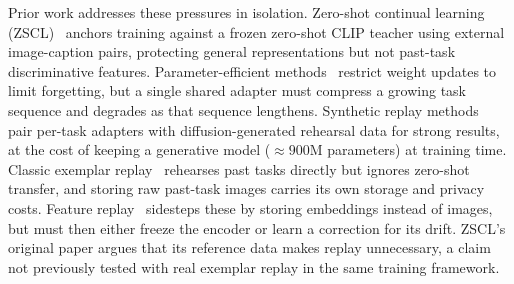 Prior work addresses these pressures in isolation. Zero-shot continual learning (ZSCL)~\cite{zheng2023zscl} anchors training against a frozen zero-shot CLIP teacher using external image-caption pairs, protecting general representations but not past-task discriminative features. Parameter-efficient methods~\cite{yu2024moe, gao2024zaf, liu2025cclip} restrict weight updates to limit forgetting, but a single shared adapter must compress a growing task sequence and degrades as that sequence lengthens. Synthetic replay methods~\cite{loraloop2025, gift2025} pair per-task adapters with diffusion-generated rehearsal data for strong results, at the cost of keeping a generative model (${\approx}900$M parameters) at training time. Classic exemplar replay~\cite{rebuffi2017icarl, buzzega2020dark} rehearses past tasks directly but ignores zero-shot transfer, and storing raw past-task images carries its own storage and privacy costs. Feature replay~\cite{hayes2020remind, iscen2020memory} sidesteps these by storing embeddings instead of images, but must then either freeze the encoder or learn a correction for its drift. ZSCL's original paper argues that its reference data makes replay unnecessary, a claim not previously tested with real exemplar replay in the same training framework.

